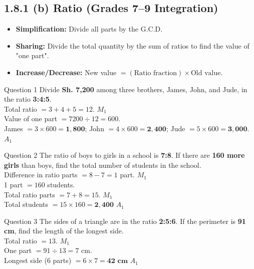 \documentclass[12pt, a4paper, oneside]{article}
\begin{document}
\subsection*{1.8.1 (b) Ratio (Grades 7--9 Integration)}

\begin{tcolorbox}[colback=lightgrey, colframe=primaryblue, title=\textbf{Teacher's Key Concept}, arc=5pt]
    \begin{itemize}
        \item \textbf{Simplification:} Divide all parts by the G.C.D.
        \item \textbf{Sharing:} Divide the total quantity by the sum of ratios to find the value of "one part".
        \item \textbf{Increase/Decrease:} New value $= (\text{Ratio fraction}) \times \text{Old value}$.
    \end{itemize}
\end{tcolorbox}

\begin{solvingbox}{Question 1}
Divide \textbf{Sh. 7,200} among three brothers, James, John, and Jude, in the ratio \textbf{3:4:5}. \\
Total ratio $= 3+4+5 = 12$. \hfill $M_1$ \\
Value of one part $= 7200 \div 12 = 600$. \\
James $= 3 \times 600 = \mathbf{1,800}$; John $= 4 \times 600 = \mathbf{2,400}$; Jude $= 5 \times 600 = \mathbf{3,000}$. \hfill $A_1$
\end{solvingbox}

\begin{solvingbox}{Question 2}
The ratio of boys to girls in a school is \textbf{7:8}. If there are \textbf{160 more girls} than boys, find the total number of students in the school. \\
Difference in ratio parts $= 8 - 7 = 1$ part. \hfill $M_1$ \\
1 part $= 160$ students. \\
Total ratio parts $= 7 + 8 = 15$. \hfill $M_1$ \\
Total students $= 15 \times 160 = \mathbf{2,400}$ \hfill $A_1$
\end{solvingbox}

\begin{solvingbox}{Question 3}
The sides of a triangle are in the ratio \textbf{2:5:6}. If the perimeter is \textbf{91 cm}, find the length of the longest side. \\
Total ratio $= 13$. \hfill $M_1$ \\
One part $= 91 \div 13 = 7$ cm. \\
Longest side (6 parts) $= 6 \times 7 = \mathbf{42\text{ cm}}$ \hfill $A_1$
\end{solvingbox}
\end{document}
